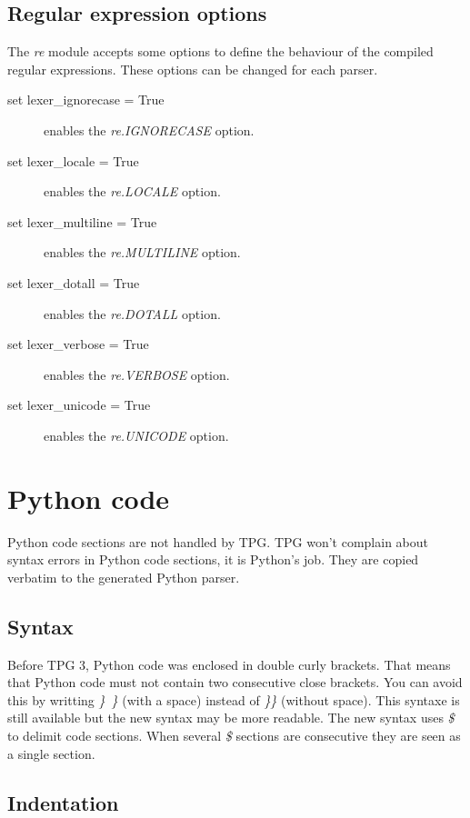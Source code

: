 \subsection{Regular expression options}

The \emph{re} module accepts some options to define the behaviour of the compiled regular expressions.
These options can be changed for each parser.

\begin{description}
    \item [set lexer\_ignorecase = True] enables the \emph{re.IGNORECASE} option.
    \item [set lexer\_locale = True] enables the \emph{re.LOCALE} option.
    \item [set lexer\_multiline = True] enables the \emph{re.MULTILINE} option.
    \item [set lexer\_dotall = True] enables the \emph{re.DOTALL} option.
    \item [set lexer\_verbose = True] enables the \emph{re.VERBOSE} option.
    \item [set lexer\_unicode = True] enables the \emph{re.UNICODE} option.
\end{description}

\section{Python code}                                       \label{grammar:code}

Python code sections are not handled by TPG.
TPG won't complain about syntax errors in Python code sections, it is Python's job.
They are copied verbatim to the generated Python parser.

\subsection{Syntax}

Before TPG 3, Python code was enclosed in double curly brackets.
That means that Python code must not contain two consecutive close brackets.
You can avoid this by writting \emph{\}~\}} (with a space) instead of \emph{\}\}} (without space).
This syntaxe is still available but the new syntax may be more readable.
The new syntax uses \emph{\$} to delimit code sections.
When several \emph{\$} sections are consecutive they are seen as a single section.

\subsection{Indentation}

